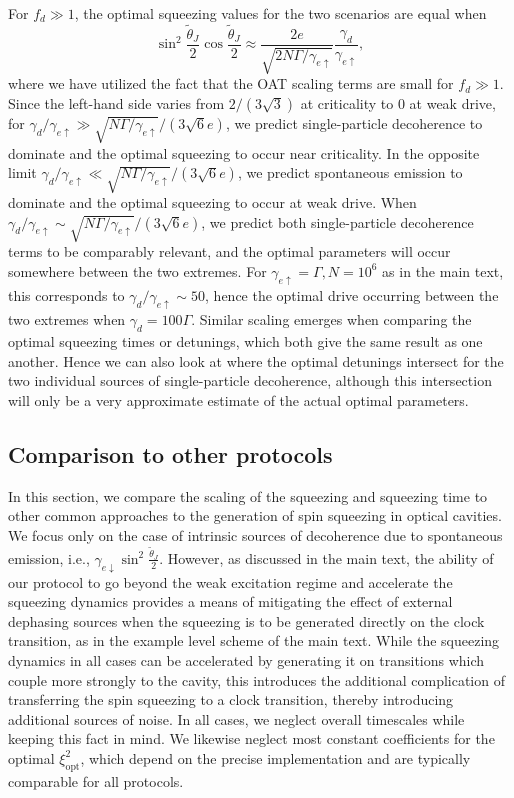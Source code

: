 For $f_d \gg 1$, the optimal squeezing values for the two scenarios are equal when
\begin{equation}
\label{eq:optdecse}
    \sin^2 \frac{\tilde{\theta}_J}{2} \cos \frac{\tilde{\theta}_J}{2} \approx \frac{2 e }{\sqrt{2 N \Gamma/\gamma_{e \uparrow}}} \frac{\gamma_d}{\gamma_{e \uparrow}},
\end{equation}
where we have utilized the fact that the OAT scaling terms are small for $f_d \gg 1$. Since the left-hand side varies from $2/(3 \sqrt{3})$ at criticality to 0 at weak drive, for $\gamma_d/\gamma_{e \uparrow} \gg  \sqrt{ N \Gamma/\gamma_{e \uparrow}}/(3 \sqrt{6} e)$, we predict single-particle decoherence to dominate and the optimal squeezing to occur near criticality. In the opposite limit $\gamma_d/\gamma_{e \uparrow} \ll \sqrt{ N \Gamma/\gamma_{e \uparrow}}/(3 \sqrt{6} e)$, we predict spontaneous emission to dominate and the optimal squeezing to occur at weak drive. When $\gamma_d/\gamma_{e \uparrow} \sim \sqrt{ N \Gamma/\gamma_{e \uparrow}}/(3 \sqrt{6} e)$, we predict both single-particle decoherence terms to be comparably relevant, and the optimal parameters will occur somewhere between the two extremes. For $\gamma_{e \uparrow} = \Gamma, N = 10^6$ as in the main text, this corresponds to $\gamma_d/\gamma_{e \uparrow} \sim 50$, hence the optimal drive occurring between the two extremes when $\gamma_d = 100 \Gamma$. Similar scaling emerges when comparing the optimal squeezing times or detunings, which both give the same result as one another. Hence we can also look at where the optimal detunings intersect for the two individual sources of single-particle decoherence, although this intersection will only be a very approximate estimate of the actual optimal parameters. 

\subsection{Comparison to other protocols}

In this section, we compare the scaling of the squeezing and squeezing time to other common approaches to the generation of spin squeezing in optical cavities. We focus only on the case of intrinsic sources of decoherence due to spontaneous emission, i.e., $\gamma_{e \downarrow} \sin^2 \frac{\tilde{\theta}_J}{2}$. However, as discussed in the main text, the ability of our protocol to go beyond the weak excitation regime and accelerate the squeezing dynamics provides a means of mitigating the effect of external dephasing sources when the squeezing is to be generated directly on the clock transition, as in the example level scheme of the main text. While the squeezing dynamics in all cases can be accelerated by generating it on transitions which couple more strongly to the cavity, this introduces the additional complication of transferring the spin squeezing to a clock transition, thereby introducing additional sources of noise. In all cases, we neglect overall timescales while keeping this fact in mind. We likewise neglect most constant coefficients for the optimal $\xi^2_{\text{opt}}$, which depend on the precise implementation and are typically comparable for all protocols. 

